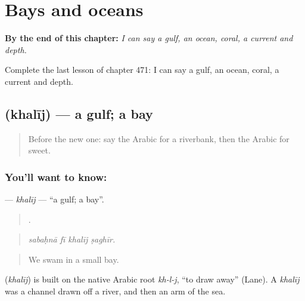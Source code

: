
\chapter{Bays and oceans}
\label{ch:ar-bays-and-oceans}

\begin{chapteropening}
\textbf{By the end of this chapter:} \emph{I can say a gulf, an ocean, coral, a current and depth.}

Complete the last lesson of chapter 471: I can say a gulf, an ocean, coral, a current and depth.
\end{chapteropening}

\section[\texorpdfstring{\ar{خليج} (khalīj)}{خليج (khalīj)}]{ (khalīj) — a gulf; a bay}

\label{lesson:AR-C471-khalij}



\begin{quote}
Before the new one: say the Arabic for a riverbank, then the Arabic for sweet.
\end{quote}

\subsection*{You'll want to know: }
\textbf{} — \emph{khalīj} — \textquotedblleft{}a gulf; a bay\textquotedblright{}.

\begin{quote}
   .
\end{quote}

\begin{quote}
\emph{sabaḥnā fī khalīj ṣaghīr.}
\end{quote}

\begin{quote}
We swam in a small bay.
\end{quote}

\begin{cousinweb}
\textbf{} (\emph{khalīj}) is built on the native Arabic root \emph{kh-l-j}, \textquotedblleft{}to draw away\textquotedblright{} (Lane). A \emph{khalīj} was a channel drawn off a river, and then an arm of the sea.
\end{cousinweb}

